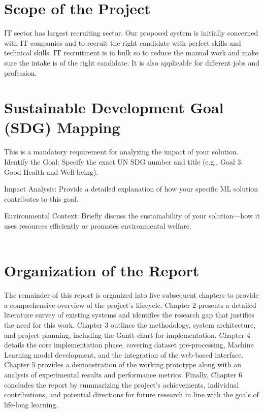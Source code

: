 \section{Scope of the Project} 

IT sector has largest recruiting sector. Our proposed system is initially concerned with IT companies and to recruit the right candidate with perfect skills and technical skills. IT recruitment is in bulk so to reduce the manual work and make sure the intake is of the right candidate. It is also applicable for different jobs and profession.

\section{Sustainable Development Goal (SDG) Mapping} 
This is a mandatory requirement for analyzing the impact of your solution.
Identify the Goal: Specify the exact UN SDG number and title (e.g., Goal 3: Good Health and Well-being).

Impact Analysis: Provide a detailed explanation of how your specific ML solution contributes to this goal.

Environmental Context: Briefly discuss the sustainability of your solution—how it uses resources efficiently or promotes environmental welfare.\\\\


\section{Organization of the Report} 
The remainder of this report is organized into five subsequent chapters to provide a comprehensive overview of the project’s lifecycle. Chapter 2 presents a detailed literature survey of existing systems and identifies the research gap that justifies the need for this work. Chapter 3 outlines the methodology, system architecture, and project planning, including the Gantt chart for implementation. Chapter 4 details the core implementation phase, covering dataset pre-processing, Machine Learning model development, and the integration of the web-based interface. Chapter 5 provides a demonstration of the working prototype along with an analysis of experimental results and performance metrics. Finally, Chapter 6 concludes the report by summarizing the project's achievements, individual contributions, and potential directions for future research in line with the goals of life-long learning.

